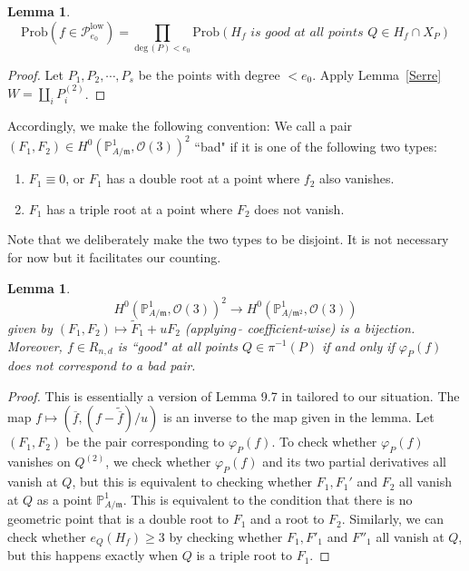 \documentclass[12pt]{article}
\theoremstyle{plain}
\newtheorem{lemma}[equation]{Lemma}
\theoremstyle{definition}
\newcommand{\fm}{\mathfrak{m}}
\newcommand{\IP}{\mathbb{P}}
\newcommand{\sO}{\mathcal{O}}
\newcommand{\sP}{\mathcal{P}}
\renewcommand{\deg}{\mathrm{deg}\,}
\newcommand\wb{\overline}
\newcommand{\<}{\langle}
\renewcommand{\>}{\rangle}
\def\wt{\widetilde}
\newcommand{\Prob}{\mathrm{Prob}}
\begin{document}
\begin{lemma}
\label{Low}
$$\Prob(f \in \sP_{e_0}^{\mathrm{low}})  = \prod_{\deg(P) < e_0}  \Prob( H_f \textit{ is good at all points } Q \in H_f \cap X_P ) $$
\end{lemma}
\begin{proof}
Let $P_1, P_2, \cdots, P_s$ be the points with degree $< e_0$. Apply Lemma~\ref{Serre} $W = \coprod_i P_i^{(2)}$. 
\end{proof}

Accordingly, we make the following convention:
 We call a pair $(F_1, F_2) \in H^0(\IP^1_{A/\fm}, \sO(3))^2$ ``bad" if it is one of the following two types:
\begin{enumerate}
\item $F_1 \equiv 0$, or $F_1$ has a double root at a point where $f_2$ also vanishes. 
\item $F_1$ has a triple root at a point where $F_2$ does not vanish. 
\end{enumerate}
Note that we deliberately make the two types to be disjoint. It is not necessary for now but it facilitates our counting. 

\begin{lemma}
$$ H^0(\IP^1_{A/\fm}, \sO(3))^2 \to H^0(\IP^1_{A/\fm^2}, \sO(3)) $$
given by $(F_1, F_2) \mapsto \wt{F}_1 + uF_2$ (applying $\, \wt{}$ coefficient-wise) is a bijection. Moreover, $f \in R_{n, d}$ is ``good" at all points $Q \in \pi^{-1}(P)$ if and only if $\varphi_P(f)$ does not correspond to a bad pair. 
\end{lemma}
\begin{proof}
This is essentially a version of Lemma 9.7 in \cite{Wood} tailored to our situation. The map $f \mapsto ( \wb{f}, (f - \wt{\wb{f}})/u)$ is an inverse to the map given in the lemma. Let $(F_1, F_2)$ be the pair corresponding to $\varphi_P(f)$. To check whether $\varphi_P(f)$ vanishes on $Q^{(2)}$, we check whether $\varphi_P(f)$ and its two partial derivatives all vanish at $Q$, but this is equivalent to checking whether $F_1, F_1'$ and $F_2$ all vanish at $Q$ as a point $\IP^1_{A/\fm}$. This is equivalent to the condition that there is no geometric point that is a double root to $F_1$ and  a root to $F_2$. Similarly, we can check whether $e_Q(H_f) \ge 3$ by checking whether $F_1, F'_1$ and $F''_1$ all vanish at $Q$, but this happens exactly when $Q$ is a triple root to $F_1$. 
\end{proof}
\end{document}
